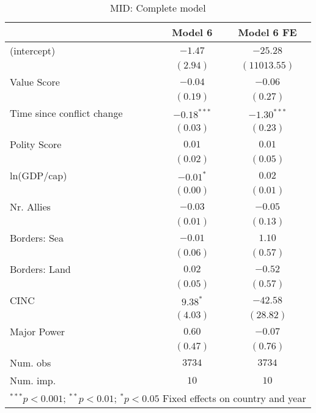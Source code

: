 
\begin{table}
\begin{center}
\begin{tabular}{l c c}
\toprule
 & Model 6 & Model 6 FE \\
\midrule
(intercept)                & $-1.47$       & $-25.28$      \\
                           & $(2.94)$      & $(11013.55)$  \\
Value Score                & $-0.04$       & $-0.06$       \\
                           & $(0.19)$      & $(0.27)$      \\
Time since conflict change & $-0.18^{***}$ & $-1.30^{***}$ \\
                           & $(0.03)$      & $(0.23)$      \\
Polity Score               & $0.01$        & $0.01$        \\
                           & $(0.02)$      & $(0.05)$      \\
ln(GDP/cap)                & $-0.01^{*}$   & $0.02$        \\
                           & $(0.00)$      & $(0.01)$      \\
Nr. Allies                 & $-0.03$       & $-0.05$       \\
                           & $(0.01)$      & $(0.13)$      \\
Borders: Sea               & $-0.01$       & $1.10$        \\
                           & $(0.06)$      & $(0.57)$      \\
Borders: Land              & $0.02$        & $-0.52$       \\
                           & $(0.05)$      & $(0.57)$      \\
CINC                       & $9.38^{*}$    & $-42.58$      \\
                           & $(4.03)$      & $(28.82)$     \\
Major Power                & $0.60$        & $-0.07$       \\
                           & $(0.47)$      & $(0.76)$      \\
\midrule
Num. obs                   & $3734$        & $3734$        \\
Num. imp.                  & $10$          & $10$          \\
\bottomrule
\multicolumn{3}{l}{\scriptsize{$^{***}p<0.001$; $^{**}p<0.01$; $^{*}p<0.05$ 
 Fixed effects on country and year}}
\end{tabular}
\caption{MID: Complete model}
\label{MID_3}
\end{center}
\end{table}
